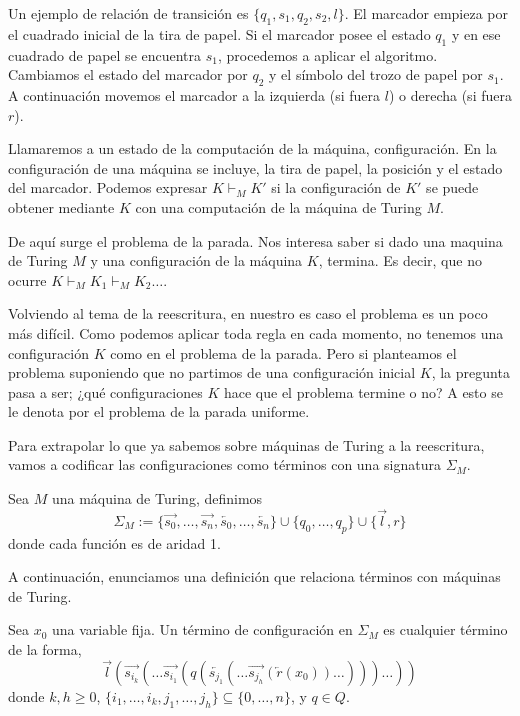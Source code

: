 Un ejemplo de relación de transición es $\{ q_1, s_1, q_2, s_2, l
\}$. El marcador empieza por el cuadrado inicial de la tira de
papel. Si el marcador posee el estado $q_1$ y en ese cuadrado de
papel se encuentra $s_1$, procedemos a aplicar el algoritmo. Cambiamos
el estado del marcador por $q_2$ y el símbolo del trozo de papel por
$s_1$. A continuación movemos el marcador a la izquierda (si fuera
$l$) o derecha (si fuera $r$).


Llamaremos a un estado de la computación de la máquina,
configuración. En la configuración de una máquina se incluye, la tira
de papel, la posición y el estado del marcador. Podemos expresar
$K \vdash_M K'$ si la configuración de $K'$ se puede obtener mediante
$K$ con una computación de la máquina de Turing $M$.

De aquí surge el problema de la parada. Nos interesa saber si dado una
maquina de Turing $M$ y una configuración de la máquina $K$,
termina. Es decir, que no ocurre $K \vdash_M K_1 \vdash_M K_2 \dots$.

Volviendo al tema de la reescritura, en nuestro es caso el problema es
un poco más difícil. Como podemos aplicar toda regla en cada momento,
no tenemos una configuración $K$ como en el problema de la
parada. Pero si planteamos el problema suponiendo que no partimos de
una configuración inicial $K$, la pregunta pasa a ser; ¿qué
configuraciones $K$ hace que el problema termine o no? A esto se le
denota por el problema de la parada uniforme. 

Para extrapolar lo que ya sabemos sobre máquinas de Turing a la
reescritura, vamos a codificar las configuraciones como términos con
una signatura $\Sigma_M$.

\begin{defi}
Sea $M$ una máquina de Turing, definimos 
\[
  \Sigma_M := \{ \overrightarrow{s_0}, \dots, \overrightarrow{s_n},
  \overleftarrow{s_0}, \dots, \overleftarrow{s_n} \} \cup \{q_0,
  \dots, q_p \} \cup \{\overrightarrow{l}, r \}
\]
donde cada función es de aridad 1.
\end{defi}

A continuación, enunciamos una definición que relaciona términos con
máquinas de Turing.

\begin{defi}
  Sea $x_0$ una variable fija. Un término de configuración en
  $\Sigma_M$ es cualquier término de la forma,
\[
  \overrightarrow{l}(\overrightarrow{s_{i_k}}(\dots
  \overrightarrow{s_{i_1}}(q(\overleftarrow{s_{j_1}}(\dots
  \overrightarrow{s_{j_h}}(\overleftarrow{r}(x_0))\dots)))\dots))
\]
donde $k,h \geq 0$, $\{i_1, \dots, i_k, j_1, \dots, j_h \} \subseteq \{0, \dots, n \}$, y $q \in Q$.
\end{defi}

